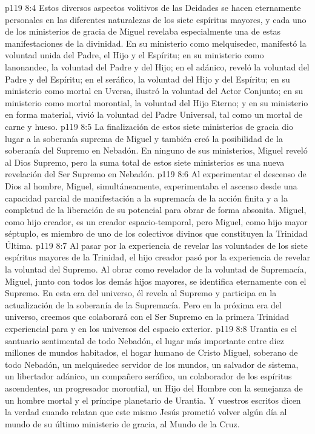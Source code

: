 \vs p119 8:4 Estos diversos aspectos volitivos de las Deidades se hacen eternamente personales en las diferentes naturalezas de los siete espíritus mayores, y cada uno de los ministerios de gracia de Miguel revelaba especialmente una de estas manifestaciones de la divinidad. En su ministerio como melquisedec, manifestó la voluntad unida del Padre, el Hijo y el Espíritu; en su ministerio como lanonandec, la voluntad del Padre y del Hijo; en el adánico, reveló la voluntad del Padre y del Espíritu; en el seráfico, la voluntad del Hijo y del Espíritu; en su ministerio como mortal en Uversa, ilustró la voluntad del Actor Conjunto; en su ministerio como mortal morontial, la voluntad del Hijo Eterno; y en su ministerio en forma material, vivió la voluntad del Padre Universal, tal como un mortal de carne y hueso.
\vs p119 8:5 La finalización de estos siete ministerios de gracia dio lugar a la soberanía suprema de Miguel y también creó la posibilidad de la soberanía del Supremo en Nebadón. En ninguno de sus ministerios, Miguel reveló al Dios Supremo, pero la suma total de estos siete ministerios es una nueva revelación del Ser Supremo en Nebadón.
\vs p119 8:6 Al experimentar el descenso de Dios al hombre, Miguel, simultáneamente, experimentaba el ascenso desde una capacidad parcial de manifestación a la supremacía de la acción finita y a la completud de la liberación de su potencial para obrar de forma absonita. Miguel, como hijo creador, es un creador espacio\hyp{}temporal, pero Miguel, como hijo mayor séptuplo, es miembro de uno de los colectivos divinos que constituyen la Trinidad Última.
\vs p119 8:7 Al pasar por la experiencia de revelar las voluntades de los siete espíritus mayores de la Trinidad, el hijo creador pasó por la experiencia de revelar la voluntad del Supremo. Al obrar como revelador de la voluntad de Supremacía, Miguel, junto con todos los demás hijos mayores, se identifica eternamente con el Supremo. En esta era del universo, él revela al Supremo y participa en la actualización de la soberanía de la Supremacía. Pero en la próxima era del universo, creemos que colaborará con el Ser Supremo en la primera Trinidad experiencial para y en los universos del espacio exterior.
\vs p119 8:8 \pc Urantia es el santuario sentimental de todo Nebadón, el lugar más importante entre diez millones de mundos habitados, el hogar humano de Cristo Miguel, soberano de todo Nebadón, un melquisedec servidor de los mundos, un salvador de sistema, un libertador adánico, un compañero seráfico, un colaborador de los espíritus ascendentes, un progresador morontial, un Hijo del Hombre con la semejanza de un hombre mortal y el príncipe planetario de Urantia. Y vuestros escritos dicen la verdad cuando relatan que este mismo Jesús prometió volver algún día al mundo de su último ministerio de gracia, al Mundo de la Cruz.
